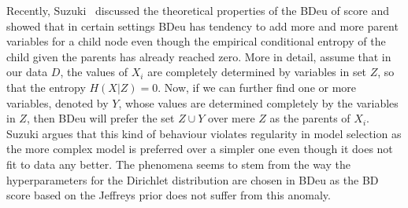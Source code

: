 Recently, Suzuki~\cite{Suzuki2017} discussed the theoretical properties of the BDeu of score and showed that in certain settings BDeu has tendency to add more and more parent variables for a child node even though the empirical conditional entropy of the child given the parents has already reached zero. More in detail, assume that in our data $D$, the values of $X_i$ are completely determined by variables in set $Z$, so that the entropy $H(X | Z) = 0$. Now, if we can further find one or more variables, denoted by $Y$, whose values are determined completely by the variables in $Z$, then BDeu will prefer the set $Z\cup Y$ over mere $Z$ as the parents of $X_i$. Suzuki argues that this kind of behaviour violates regularity in model selection as the more complex model is preferred over a simpler one even though it does not fit to data any better. The phenomena seems to stem from the way the hyperparameters for the Dirichlet distribution are chosen in BDeu as the  BD score based on the Jeffreys prior does not suffer from this anomaly.    

